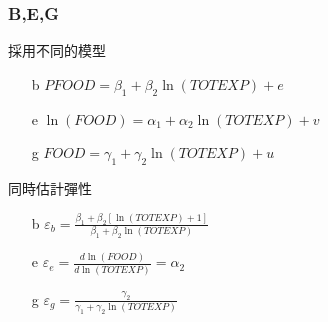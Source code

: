 \begin{frame}
    \frametitle{B,E,G}
    採用不同的模型
    \begin{enumerate}
        \item[b] $PFOOD = \beta_1 + \beta_2 \ln(TOTEXP) + e$
        \item[e] $\ln(FOOD) = \alpha_1 + \alpha_2\ln(TOTEXP) + v$
        \item[g]  $FOOD = \gamma_1 + \gamma_2\ln(TOTEXP) + u$
    \end{enumerate}
    \vfill
    同時估計彈性
    \begin{enumerate}
        \item[b] $\varepsilon_b = \frac{\beta_1 + \beta_2[\ln(TOTEXP)+1]}{\beta_1 + \beta_2\ln(TOTEXP)}$
        \item[e] $\varepsilon_e = \frac{d \ln(FOOD)}{d \ln(TOTEXP)} = \alpha_2$
        \item[g]  $\varepsilon_g = \frac{\gamma_2}{\gamma_1 + \gamma_2 \ln(TOTEXP)}$
    \end{enumerate}
    

\end{frame}